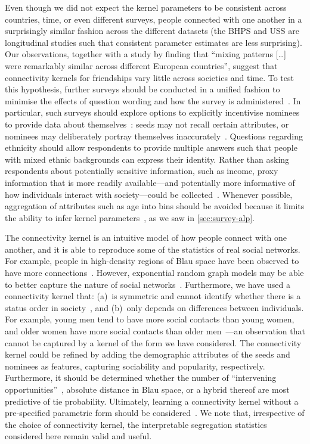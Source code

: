 \documentclass{scrartcl}
\begin{document}
Even though we did not expect the kernel parameters to be consistent across countries, time, or even different surveys, people connected with one another in a surprisingly similar fashion across the different datasets (the BHPS and USS are longitudinal studies such that consistent parameter estimates are less surprising). Our observations, together with a study by \textcite{Mossong2008} finding that ``mixing patterns [\ldots] were remarkably similar across different European countries'', suggest that connectivity kernels for friendships vary little across societies and time. To test this hypothesis, further surveys should be conducted in a unified fashion to minimise the effects of question wording and how the survey is administered~\cite{Eagle2015}. In particular, such surveys should explore options to explicitly incentivise nominees to provide data about themselves~\cite{Biernacki1981}: seeds may not recall certain attributes, or nominees may deliberately portray themselves inaccurately~\cite{Bruch2016}. Questions regarding ethnicity should allow respondents to provide multiple answers such that people with mixed ethnic backgrounds can express their identity. Rather than asking respondents about potentially sensitive information, such as income, proxy information that is more readily available---and potentially more informative of how individuals interact with society---could be collected~\cite{Po2012}. Whenever possible, aggregation of attributes such as age into bins should be avoided because it limits the ability to infer kernel parameters~\cite{Hutcheon2010}, as we saw in \cref{sec:survey-alp}.

The connectivity kernel is an intuitive model of how people connect with one another, and it is able to reproduce some of the statistics of real social networks. For example, people in high-density regions of Blau space have been observed to have more connections~\cite{Currarini2009}. However, exponential random graph models may be able to better capture the nature of social networks~\cite{Wimmer2010}. Furthermore, we have used a connectivity kernel that: (a)~is symmetric and cannot identify whether there is a status order in society~\cite{Chan2004,Ball2013}, and (b)~only depends on differences between individuals. For example, young men tend to have more social contacts than young women, and older women have more social contacts than older men~\cite{Bhattacharya2016}---an observation that cannot be captured by a kernel of the form we have considered. The connectivity kernel could be refined by adding the demographic attributes of the seeds and nominees as features, capturing sociability and popularity, respectively. Furthermore, it should be determined whether the number of ``intervening opportunities''~\cite{Stouffer1940}, absolute distance in Blau space, or a hybrid thereof are most predictive of tie probability. Ultimately, learning a connectivity kernel without a pre-specified parametric form should be considered~\cite{Frolich2006}. We note that, irrespective of the choice of connectivity kernel, the interpretable segregation statistics considered here remain valid and useful.
\end{document}
